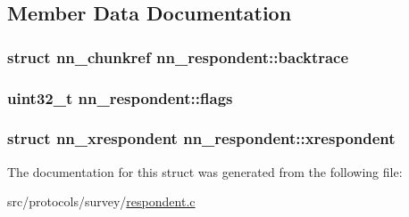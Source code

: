 \subsection{Member Data Documentation}
\subsubsection[{backtrace}]{\setlength{\rightskip}{0pt plus 5cm}struct {\bf nn\+\_\+chunkref} nn\+\_\+respondent\+::backtrace}\hypertarget{structnn__respondent_acca478c8d55146f2a2a26ab18a4e3e35}{}\label{structnn__respondent_acca478c8d55146f2a2a26ab18a4e3e35}
\subsubsection[{flags}]{\setlength{\rightskip}{0pt plus 5cm}uint32\+\_\+t nn\+\_\+respondent\+::flags}\hypertarget{structnn__respondent_aa7b5f3f38f77166ddd7ab979d2159443}{}\label{structnn__respondent_aa7b5f3f38f77166ddd7ab979d2159443}
\subsubsection[{xrespondent}]{\setlength{\rightskip}{0pt plus 5cm}struct {\bf nn\+\_\+xrespondent} nn\+\_\+respondent\+::xrespondent}\hypertarget{structnn__respondent_ac4c692123b8ffc5427d75f7a66666026}{}\label{structnn__respondent_ac4c692123b8ffc5427d75f7a66666026}


The documentation for this struct was generated from the following file\+:\begin{DoxyCompactItemize}
\item 
src/protocols/survey/\hyperlink{respondent_8c}{respondent.\+c}\end{DoxyCompactItemize}
